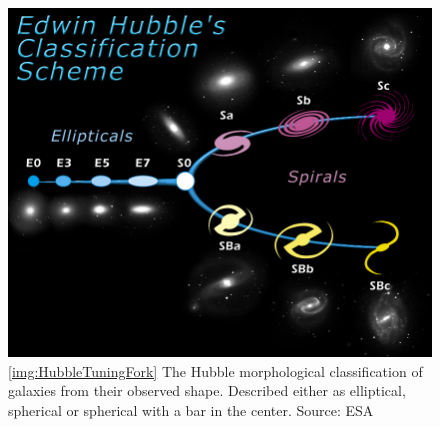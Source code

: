 
\begin{figure}
  \centering
  \includegraphics[width=\figwidth]{img/HubbleTuningFork.jpg}
  \caption{\ref{img:HubbleTuningFork}
    The Hubble morphological classification of galaxies from their observed shape. Described either as elliptical, spherical or spherical with a bar in the center.
    Source: ESA
  }
\end{figure}
